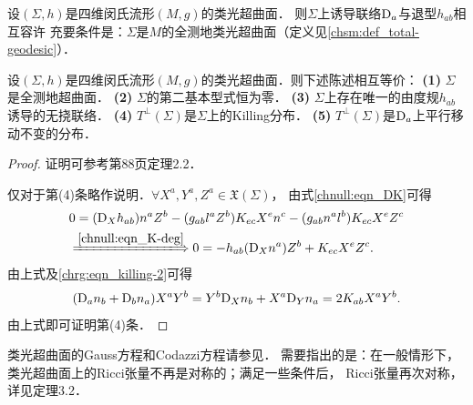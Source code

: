 \begin{proposition}
    设$(\Sigma,h)$是四维闵氏流形$(M,g)$的类光超曲面．
    则$\Sigma$上诱导联络${\rm D}_a$与退型$h_{ab}$相互容许
    充要条件是：$\Sigma$是$M$的全测地类光超曲面（定义见\ref{chsm:def_total-geodesic}）．
\end{proposition}


\begin{proposition}
    设$(\Sigma,h)$是四维闵氏流形$(M,g)$的类光超曲面．则下述陈述相互等价：    
    {\bfseries (1)} $\Sigma$是全测地超曲面．    
    {\bfseries (2)} $\Sigma$的第二基本型式恒为零．    
    {\bfseries (3)} $\Sigma$上存在唯一的由度规$h_{ab}$诱导的无挠联络．    
    {\bfseries (4)} $T^\perp(\Sigma)$是$\Sigma$上的Killing分布．    
    {\bfseries (5)} $T^\perp(\Sigma)$是${\rm D}_a$上平行移动不变的分布．
\end{proposition}

\begin{proof}
    证明可参考\parencite{Duggal-Bejancu-1996}第88页定理2.2．

仅对于第(4)条略作说明．$\forall X^a,Y^a,Z^a \in \mathfrak{X}(\Sigma)$，
由式\eqref{chnull:eqn_DK}可得
\begin{align}
    &0=({\rm D}_{X}h_{ab}) n^a Z^b
    -(g_{ab} l^a Z^b) K_{ec}  X^e n^c   - (g_{ab}n^a l^b) K_{ec}  X^e Z^c 
     \notag \\
    &\xLongrightarrow{\ref{chnull:eqn_K-deg}} 
    0= - h_{ab} ({\rm D}_X n^a) Z^b + K_{ec}  X^e Z^c .
\end{align}
由上式及\eqref{chrg:eqn_killing-2}可得
\begin{align}
    ({\rm D}_a n_b + {\rm D}_b n_a ) X^a Y^b
    =Y^b {\rm D}_X n_b + X^a {\rm D}_Y n_a 
    =2 K_{ab} X^a Y^b.
\end{align}
由上式即可证明第(4)条．
\end{proof}




类光超曲面的Gauss方程和Codazzi方程请参见\parencite[\S 4.3]{Duggal-Bejancu-1996}．
需要指出的是：在一般情形下，类光超曲面上的Ricci张量不再是对称的；满足一些条件后，
Ricci张量再次对称，详见\parencite[\S 4.3]{Duggal-Bejancu-1996}{\kaishu 定理}3.2．


